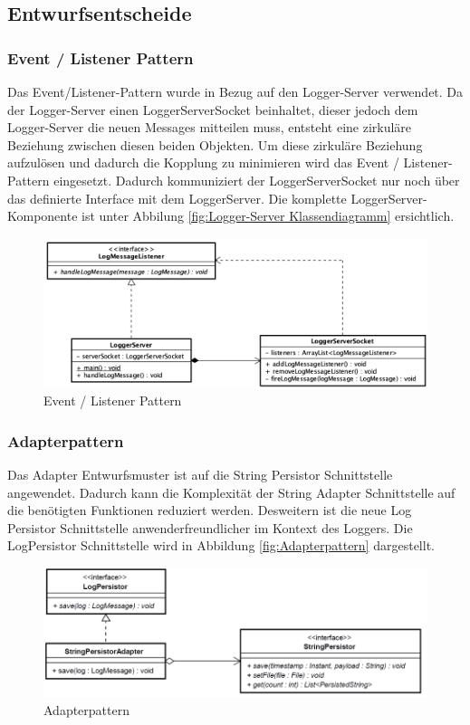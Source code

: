 \newpage
\subsection{Entwurfsentscheide}
\subsubsection{Event / Listener Pattern}
Das Event/Listener-Pattern wurde in Bezug auf den Logger-Server verwendet. Da der Logger-Server einen LoggerServerSocket beinhaltet, dieser jedoch dem Logger-Server die neuen Messages mitteilen muss, entsteht eine zirkuläre Beziehung zwischen diesen beiden Objekten. 
Um diese zirkuläre Beziehung aufzulösen und dadurch die Kopplung zu minimieren wird das Event / Listener-Pattern eingesetzt. Dadurch kommuniziert der LoggerServerSocket nur noch über das definierte Interface mit dem LoggerServer. Die komplette LoggerServer-Komponente ist unter Abbilung \ref{fig:Logger-Server Klassendiagramm} ersichtlich.
\begin{figure}[H]
	\centering
	\includegraphics[width=\textwidth]{2_Architektur/Bilder/loggerServer_EventListener.png}
	\caption{Event / Listener Pattern}
	\label{fig:Event / Listener Pattern}
\end{figure}

\subsubsection{Adapterpattern}
Das Adapter Entwurfsmuster ist auf die String Persistor Schnittstelle angewendet. Dadurch kann die Komplexität der String Adapter Schnittstelle auf die benötigten Funktionen reduziert werden. Desweitern ist die neue Log Persistor Schnittstelle anwenderfreundlicher im Kontext des Loggers. Die LogPersistor Schnittstelle wird in Abbildung \ref{fig:Adapterpattern} dargestellt.
\begin{figure}[H]
	\centering
	\includegraphics[width=\textwidth]{2_Architektur/Bilder/adapterpattern.png}
	\caption{Adapterpattern}
	\label{fig:Adapterpatternn}
\end{figure}

